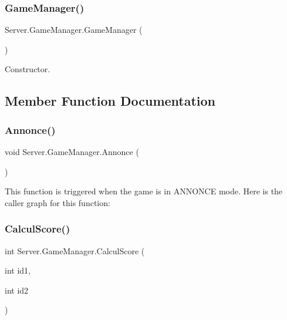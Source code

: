 \subsubsection{\texorpdfstring{Game\+Manager()}{GameManager()}}
{\footnotesize\ttfamily Server.\+Game\+Manager.\+Game\+Manager (\begin{DoxyParamCaption}{ }\end{DoxyParamCaption})\hspace{0.3cm}{\ttfamily [inline]}}

Constructor. 

\subsection{Member Function Documentation}
\mbox{\label{class_server_1_1_game_manager_a8f9c1e139a56849d75ecbe8ab73243ac}} 
\subsubsection{\texorpdfstring{Annonce()}{Annonce()}}
{\footnotesize\ttfamily void Server.\+Game\+Manager.\+Annonce (\begin{DoxyParamCaption}{ }\end{DoxyParamCaption})\hspace{0.3cm}{\ttfamily [inline]}}

This function is triggered when the game is in A\+N\+N\+O\+N\+CE mode. Here is the caller graph for this function\+:
\mbox{\label{class_server_1_1_game_manager_a7a5ac01d26fc1536d5376e982023e736}} 
\subsubsection{\texorpdfstring{Calcul\+Score()}{CalculScore()}}
{\footnotesize\ttfamily int Server.\+Game\+Manager.\+Calcul\+Score (\begin{DoxyParamCaption}\item[{int}]{id1,  }\item[{int}]{id2 }\end{DoxyParamCaption})\hspace{0.3cm}{\ttfamily [inline]}}

